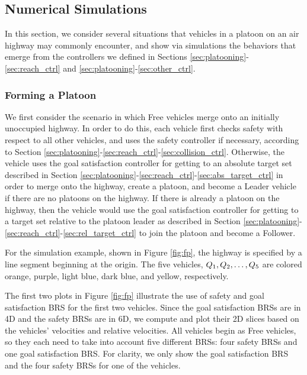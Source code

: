 \subsection{Numerical Simulations}
In this section, we consider several situations that vehicles in a platoon on an air highway may commonly encounter, and show via simulations the behaviors that emerge from the controllers we defined in Sections \ref{sec:platooning}-\ref{sec:reach_ctrl} and \ref{sec:platooning}-\ref{sec:other_ctrl}.

\subsubsection{Forming a Platoon}
We first consider the scenario in which Free vehicles merge onto an initially unoccupied highway. In order to do this, each vehicle first checks safety with respect to all other vehicles, and uses the safety controller if necessary, according to Section \ref{sec:platooning}-\ref{sec:reach_ctrl}-\ref{sec:collision_ctrl}. Otherwise, the vehicle uses the goal satisfaction controller for getting to an absolute target set described in Section \ref{sec:platooning}-\ref{sec:reach_ctrl}-\ref{sec:abs_target_ctrl} in order to merge onto the highway, create a platoon, and become a Leader vehicle if there are no platoons on the highway. If there is already a platoon on the highway, then the vehicle would use the goal satisfaction controller for getting to a target set relative to the platoon leader as described in Section \ref{sec:platooning}-\ref{sec:reach_ctrl}-\ref{sec:rel_target_ctrl} to join the platoon and become a Follower.

For the simulation example, shown in Figure \ref{fig:fp}, the highway is specified by a line segment beginning at the origin. The five vehicles, $Q_{1}, Q_{2}, \ldots, Q_{5}$ are colored orange, purple, light blue, dark blue, and yellow, respectively.

The first two plots in Figure \ref{fig:fp} illustrate the use of safety and goal satisfaction BRS for the first two vehicles. Since the goal satisfaction BRSs are in 4D and the safety BRSs are in 6D, we compute and plot their 2D slices based on the vehicles' velocities and relative velocities.  All vehicles begin as Free vehicles, so they each need to take into account five different BRSs: four safety BRSs and one goal satisfaction BRS. For clarity, we only show the goal satisfaction BRS and the four safety BRSs for one of the vehicles. 

